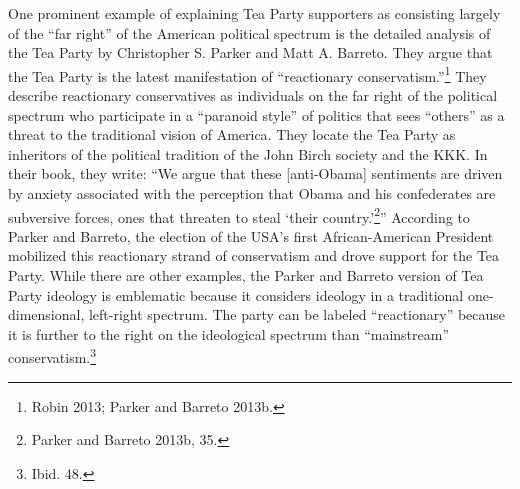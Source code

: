 \documentclass[12pt,]{article}
\begin{document}
One prominent example of explaining Tea Party supporters as consisting
largely of the ``far right'' of the American political spectrum is the
detailed analysis of the Tea Party by Christopher S. Parker and Matt A.
Barreto. They argue that the Tea Party is the latest manifestation of
``reactionary conservatism.''\footnote{Robin 2013; Parker and Barreto
  2013b. } They describe reactionary conservatives as individuals on the
far right of the political spectrum who participate in a ``paranoid
style'' of politics that sees ``others'' as a threat to the traditional
vision of America. They locate the Tea Party as inheritors of the
political tradition of the John Birch society and the KKK. In their
book, they write: ``We argue that these {[}anti-Obama{]} sentiments are
driven by anxiety associated with the perception that Obama and his
confederates are subversive forces, ones that threaten to steal `their
country.'\footnote{Parker and Barreto 2013b, 35. }'' According to Parker
and Barreto, the election of the USA's first African-American President
mobilized this reactionary strand of conservatism and drove support for
the Tea Party. While there are other examples, the Parker and Barreto
version of Tea Party ideology is emblematic because it considers
ideology in a traditional one-dimensional, left-right spectrum. The
party can be labeled ``reactionary'' because it is further to the right
on the ideological spectrum than ``mainstream'' conservatism.\footnote{Ibid.
  48. }
\end{document}
